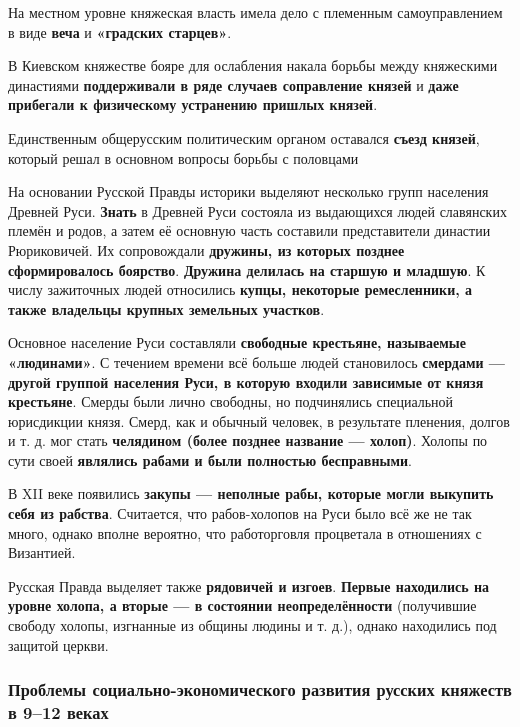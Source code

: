 \documentclass{article}
\begin{document}
На местном уровне княжеская власть имела дело с племенным самоуправлением в виде \textbf{веча} и \textbf{«градских старцев»}.

\hfill

В Киевском княжестве бояре для ослабления накала борьбы между княжескими династиями \textbf{поддерживали в ряде случаев соправление князей} и \textbf{даже прибегали к физическому устранению пришлых князей}.

Единственным общерусским политическим органом оставался \textbf{съезд князей}, который решал в основном вопросы борьбы с половцами

\hfill

На основании Русской Правды историки выделяют несколько групп населения Древней Руси. \textbf{Знать} в Древней Руси состояла из выдающихся людей славянских племён и родов, а затем её основную часть составили представители династии Рюриковичей. Их сопровождали \textbf{дружины, из которых позднее сформировалось боярство}. \textbf{Дружина делилась на старшую и младшую}. К числу зажиточных людей относились \textbf{купцы, некоторые ремесленники, а также владельцы крупных земельных участков}.

\hfill

Основное население Руси составляли \textbf{свободные крестьяне, называемые «людинами»}. С течением времени всё больше людей становилось \textbf{смердами — другой группой населения Руси, в которую входили зависимые от князя крестьяне}. Смерды были лично свободны, но подчинялись специальной юрисдикции князя. Смерд, как и обычный человек, в результате пленения, долгов и т. д. мог стать \textbf{челядином (более позднее название — холоп)}. Холопы по сути своей \textbf{являлись рабами и были полностью бесправными}.

В XII веке появились \textbf{закупы — неполные рабы, которые могли выкупить себя из рабства}. Считается, что рабов-холопов на Руси было всё же не так много, однако вполне вероятно, что работорговля процветала в отношениях с Византией.

Русская Правда выделяет также \textbf{рядовичей и изгоев}. \textbf{Первые находились на уровне холопа, а вторые — в состоянии неопределённости} (получившие свободу холопы, изгнанные из общины людины и т. д.), однако находились под защитой церкви. 

\subsubsection{Проблемы социально-экономического развития русских княжеств в 9–12 веках}
\end{document}
